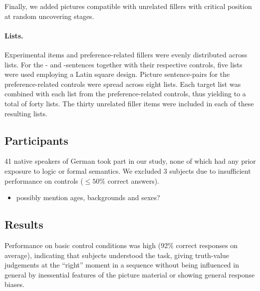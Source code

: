\documentclass[fleqn,reqno,10pt,draft]{article}
\newcommand{\as}{\acro{as}}
\renewcommand{\es}{\acro{es}}
\begin{document}
Finally, we added pictures compatible with unrelated fillers with critical position at random uncovering stages.

\paragraph{Lists.}
Experimental items and preference-related fillers were evenly distributed across lists. For the \as- and \es-sentences together with their respective controls, five lists were used employing a Latin square design. Picture sentence-pairs for the preference-related controls were spread across eight lists. Each target list was combined with each list from the preference-related controls, thus yielding to a total of forty lists. The thirty unrelated filler items were included in each of these resulting lists.


\subsection{Participants}
\label{sec:participants} 

41 native speakers of German took part in our study, none of which had
any prior exposure to logic or formal semantics. We excluded 3
subjects due to insufficient performance on controls ($\le 50\%$
correct answers). 

\begin{itemize}
\item possibly mention ages, backgrounds and sexes?
\end{itemize}


\subsection{Results}
\label{sec:results}

Performance on basic control conditions was high (92\% correct
responses on average), indicating that subjects understood the task,
giving truth-value judgements at the ``right'' moment in a sequence
without being influenced in general by inessential features of the
picture material or showing general response biases.
\end{document}
